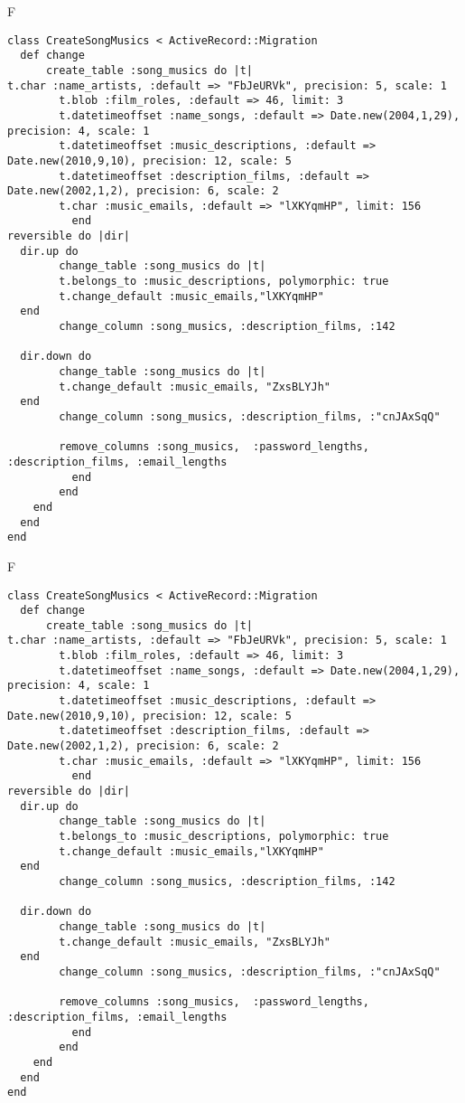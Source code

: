 F
\begin{verbatim}
class CreateSongMusics < ActiveRecord::Migration
  def change
	  create_table :song_musics do |t|
t.char :name_artists, :default => "FbJeURVk", precision: 5, scale: 1
		t.blob :film_roles, :default => 46, limit: 3
		t.datetimeoffset :name_songs, :default => Date.new(2004,1,29), precision: 4, scale: 1
		t.datetimeoffset :music_descriptions, :default => Date.new(2010,9,10), precision: 12, scale: 5
		t.datetimeoffset :description_films, :default => Date.new(2002,1,2), precision: 6, scale: 2
		t.char :music_emails, :default => "lXKYqmHP", limit: 156
		  end
reversible do |dir|
  dir.up do
		change_table :song_musics do |t|
		t.belongs_to :music_descriptions, polymorphic: true
 		t.change_default :music_emails,"lXKYqmHP"
  end
 		change_column :song_musics, :description_films, :142
   
  dir.down do
		change_table :song_musics do |t|
		t.change_default :music_emails, "ZxsBLYJh"
  end
 		change_column :song_musics, :description_films, :"cnJAxSqQ"
   
		remove_columns :song_musics,  :password_lengths, :description_films, :email_lengths 
	      end
	    end
    end 
  end
end

\end{verbatim}

F
\begin{verbatim}
class CreateSongMusics < ActiveRecord::Migration
  def change
	  create_table :song_musics do |t|
t.char :name_artists, :default => "FbJeURVk", precision: 5, scale: 1
		t.blob :film_roles, :default => 46, limit: 3
		t.datetimeoffset :name_songs, :default => Date.new(2004,1,29), precision: 4, scale: 1
		t.datetimeoffset :music_descriptions, :default => Date.new(2010,9,10), precision: 12, scale: 5
		t.datetimeoffset :description_films, :default => Date.new(2002,1,2), precision: 6, scale: 2
		t.char :music_emails, :default => "lXKYqmHP", limit: 156
		  end
reversible do |dir|
  dir.up do
		change_table :song_musics do |t|
		t.belongs_to :music_descriptions, polymorphic: true
 		t.change_default :music_emails,"lXKYqmHP"
  end
 		change_column :song_musics, :description_films, :142
   
  dir.down do
		change_table :song_musics do |t|
		t.change_default :music_emails, "ZxsBLYJh"
  end
 		change_column :song_musics, :description_films, :"cnJAxSqQ"
   
		remove_columns :song_musics,  :password_lengths, :description_films, :email_lengths 
	      end
	    end
    end 
  end
end

\end{verbatim}


